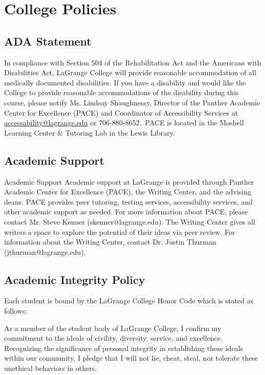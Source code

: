 \documentclass[11pt]{article}
\begin{document}

\section*{College Policies}

\subsection*{ADA Statement}

In compliance with Section 504 of the Rehabilitation Act and the Americans with Disabilities Act,
LaGrange College will provide reasonable accommodation of all medically documented disabilities. If you
have a disability and would like the College to provide reasonable accommodations of the disability during
this course, please notify Ms. Lindsay Shaughnessy, Director of the Panther Academic Center for
Excellence (PACE) and Coordinator of Accessibility Services at \href{mailto:accessability@lagrange.edu}{accessability@lagrange.edu} or 706-880-8652. PACE is located in the Moshell Learning Center \&
Tutoring Lab in the Lewis Library.


\subsection*{Academic Support}

Academic Support
Academic support at LaGrange is provided through Panther Academic Center for Excellence (PACE), the
Writing Center, and the advising deans. PACE provides peer tutoring, testing services, accessibility
services, and other academic support as needed. For more information about PACE, please contact Mr.
Steve Kenner (skenner@lagrange.edu). The Writing Center gives all writers a space to explore the potential of their ideas via peer review. For information about the Writing Center, contact Dr. Justin Thurman
(jthurman@lagrange.edu).

\subsection*{Academic Integrity Policy}

Each student is bound by the LaGrange College Honor Code which is stated as follows:

\begin{displayquote}
As a member of the student body of LaGrange College, I confirm my
commitment to the ideals of civility, diversity, service, and excellence.
Recognizing the significance of personal integrity in establishing these ideals
within our community, I pledge that I will not lie, cheat, steal, nor tolerate these
unethical behaviors in others.
\end{displayquote}
\end{document}
